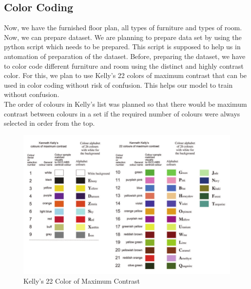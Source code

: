                 \subsection{Color Coding}
                        Now, we have the furnished floor plan, all types of furniture and types of room. Now, we can prepare dataset. We are planning to prepare data set by using the python script which needs to be prepared. This script is supposed to help us in automation of preparation of the dataset. Before, preparing the dataset, we have to color code different furniture and room using the distinct and highly contrast color. For this, we plan to use Kelly's 22 colors of maximum contrast that can be used in color coding without risk of confusion. This helps our model to train without confusion.\\
                        The order of colours in Kelly’s list was planned so that there would be maximum contrast between colours in a set if the required number of colours were always selected in order from the top.
                        \pagebreak
                        \begin{figure}[h]
                                \centering
                                \includegraphics[width=1\textwidth]{img/chapter_6/kellycolor.png}
                                \caption{Kelly's 22 Color of Maximum Contrast}
                                \label{fig:Kelly's 22 Color of Maximum Contrast}
                        \end{figure}